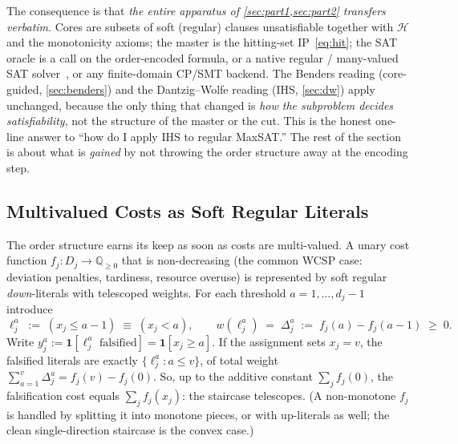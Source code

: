 The consequence is that \emph{the entire apparatus of \cref{sec:part1,sec:part2}
transfers verbatim}. Cores are subsets of soft (regular) clauses unsatisfiable
together with $\mathcal{H}$ and the monotonicity axioms; the master is the
hitting-set IP~\eqref{eq:hit}; the SAT oracle is a call on the order-encoded
formula, or a native regular / many-valued SAT solver~\citep{bejar2007regular},
or any finite-domain CP/SMT backend. The Benders reading (core-guided,
\cref{sec:benders}) and the Dantzig--Wolfe reading (IHS, \cref{sec:dw}) apply
unchanged, because the only thing that changed is \emph{how the subproblem
decides satisfiability}, not the structure of the master or the cut. This is the
honest one-line answer to ``how do I apply IHS to regular MaxSAT.'' The rest of
the section is about what is \emph{gained} by not throwing the order structure
away at the encoding step.

\subsection{Multivalued Costs as Soft Regular Literals}
\label{sec:regular-costs}

The order structure earns its keep as soon as costs are multi-valued. A unary
cost function $f_j : D_j \to \mathbb{Q}_{\ge 0}$ that is non-decreasing (the
common WCSP case: deviation penalties, tardiness, resource overuse) is
represented by soft regular \emph{down}-literals with telescoped weights. For
each threshold $a = 1,\dots,d_j-1$ introduce
\begin{equation}
\ell_j^{a} \;:=\; (x_j \le a-1) \;\equiv\; (x_j < a),
\qquad w(\ell_j^{a}) \;=\; \Delta_j^{a} \;:=\; f_j(a) - f_j(a-1) \;\ge\; 0.
\label{eq:staircase}
\end{equation}
Write $y_j^{a} := \mathbf 1[\ell_j^{a}\text{ falsified}] = \mathbf 1[x_j \ge a]$.
If the assignment sets $x_j = v$, the falsified literals are exactly
$\{\ell_j^{a} : a \le v\}$, of total weight
$\sum_{a=1}^{v}\Delta_j^{a} = f_j(v) - f_j(0)$. So, up to the additive constant
$\sum_j f_j(0)$, the falsification cost equals $\sum_j f_j(x_j)$: the staircase
telescopes. (A non-monotone $f_j$ is handled by splitting it into monotone
pieces, or with up-literals as well; the clean single-direction staircase is
the convex case.)


